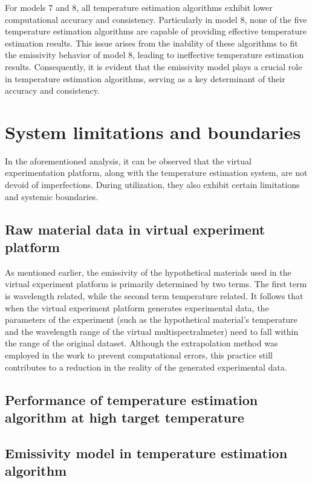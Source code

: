 For models 7 and 8, all temperature estimation algorithms exhibit lower 
computational accuracy and consistency. Particularly in model 8, 
none of the five temperature estimation algorithms are capable of providing 
effective temperature estimation results. This issue arises from the inability 
of these algorithms to fit the emissivity behavior of model 8, leading to 
ineffective temperature estimation results. Consequently, it is evident that the 
emissivity model plays a crucial role in temperature estimation algorithms, 
serving as a key determinant of their accuracy and consistency.


\section{System limitations and boundaries}
In the aforementioned analysis, it can be observed that the virtual 
experimentation platform, along with the temperature estimation system, 
are not devoid of imperfections. During utilization, they also exhibit 
certain limitations and systemic boundaries.


\subsection{Raw material data in virtual experiment platform}
As mentioned earlier, the emissivity of the hypothetical materials used in the virtual experiment 
platform is primarily determined by two terms. The first term is wavelength related, while the 
second term temperature related. It follows that when the virtual experiment platform generates 
experimental data, the parameters of the experiment (such as the hypothetical material's 
temperature and the wavelength range of the virtual multispectralmeter) need to fall within the 
range of the original dataset. Although the extrapolation method was employed in the work to prevent 
computational errors, this practice still contributes to a reduction in the reality 
of the generated experimental data.

\subsection{Performance of temperature estimation algorithm at high target temperature}

\subsection{Emissivity model in temperature estimation algorithm}